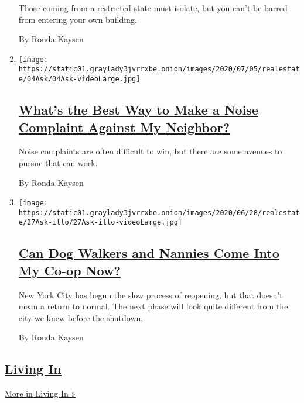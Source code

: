\begin{enumerate}
  Those coming from a restricted state must isolate, but you can't be
  barred from entering your own building.

  By Ronda Kaysen
\item
  \texttt{[image: https://static01.graylady3jvrrxbe.onion/images/2020/07/05/realestate/04Ask/04Ask-videoLarge.jpg]}

  \hypertarget{whats-the-best-way-to-make-a-noise-complaint-against-my-neighbor}{%
  \subsection{\texorpdfstring{\href{/2020/07/04/realestate/whats-the-best-way-to-make-a-noise-complaint-against-my-neighbor.html}{What's
  the Best Way to Make a Noise Complaint Against My
  Neighbor?}}{What's the Best Way to Make a Noise Complaint Against My Neighbor?}}\label{whats-the-best-way-to-make-a-noise-complaint-against-my-neighbor}}

  Noise complaints are often difficult to win, but there are some
  avenues to pursue that can work.

  By Ronda Kaysen
\item
  \texttt{[image: https://static01.graylady3jvrrxbe.onion/images/2020/06/28/realestate/27Ask-illo/27Ask-illo-videoLarge.jpg]}

  \hypertarget{can-dog-walkers-and-nannies-come-into-my-co-op-now}{%
  \subsection{\texorpdfstring{\href{/2020/06/29/realestate/coronavirus-phase-2-dog-walkers-nannies-co-op.html}{Can
  Dog Walkers and Nannies Come Into My Co-op
  Now?}}{Can Dog Walkers and Nannies Come Into My Co-op Now?}}\label{can-dog-walkers-and-nannies-come-into-my-co-op-now}}

  New York City has begun the slow process of reopening, but that
  doesn't mean a return to normal. The next phase will look quite
  different from the city we knew before the shutdown.

  By Ronda Kaysen
\end{enumerate}

\hypertarget{living-in-1}{%
\subsection{\texorpdfstring{\href{/column/living-in}{Living
In}}{Living In}}\label{living-in-1}}

\href{/column/living-in}{More in Living In »}


